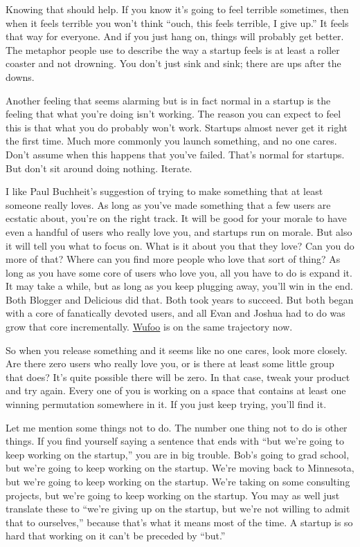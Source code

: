 \documentclass[12pt]{book}
\begin{document}
Knowing that should help. If you know it's going to feel terrible
sometimes, then when it feels terrible you won't think ``ouch, this
feels terrible, I give up.'' It feels that way for everyone. And if you
just hang on, things will probably get better. The metaphor people use
to describe the way a startup feels is at least a roller coaster and not
drowning. You don't just sink and sink; there are ups after the downs.

Another feeling that seems alarming but is in fact normal in a startup
is the feeling that what you're doing isn't working. The reason you can
expect to feel this is that what you do probably won't work. Startups
almost never get it right the first time. Much more commonly you launch
something, and no one cares. Don't assume when this happens that you've
failed. That's normal for startups. But don't sit around doing nothing.
Iterate.

I like Paul Buchheit's suggestion of trying to make something that at
least someone really loves. As long as you've made something that a few
users are ecstatic about, you're on the right track. It will be good for
your morale to have even a handful of users who really love you, and
startups run on morale. But also it will tell you what to focus on. What
is it about you that they love? Can you do more of that? Where can you
find more people who love that sort of thing? As long as you have some
core of users who love you, all you have to do is expand it. It may take
a while, but as long as you keep plugging away, you'll win in the end.
Both Blogger and Delicious did that. Both took years to succeed. But
both began with a core of fanatically devoted users, and all Evan and
Joshua had to do was grow that core incrementally.
\href{http://wufoo.com}{Wufoo} is on the same trajectory now.

So when you release something and it seems like no one cares, look more
closely. Are there zero users who really love you, or is there at least
some little group that does? It's quite possible there will be zero. In
that case, tweak your product and try again. Every one of you is working
on a space that contains at least one winning permutation somewhere in
it. If you just keep trying, you'll find it.

Let me mention some things not to do. The number one thing not to do is
other things. If you find yourself saying a sentence that ends with
``but we're going to keep working on the startup,'' you are in big
trouble. Bob's going to grad school, but we're going to keep working on
the startup. We're moving back to Minnesota, but we're going to keep
working on the startup. We're taking on some consulting projects, but
we're going to keep working on the startup. You may as well just
translate these to ``we're giving up on the startup, but we're not
willing to admit that to ourselves,'' because that's what it means most
of the time. A startup is so hard that working on it can't be preceded
by ``but.''
\end{document}
